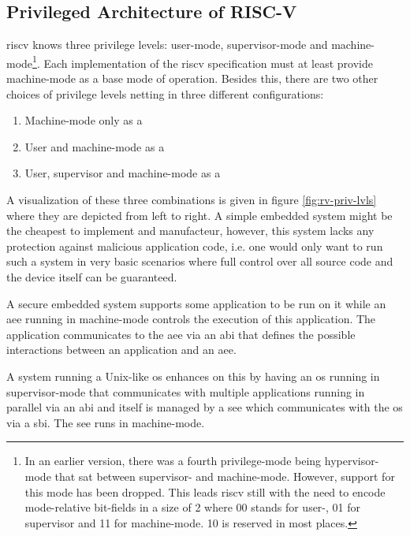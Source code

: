 \subsection{Privileged Architecture of RISC-V}
\label{sec:rv-priv-arch}

\gls{riscv} knows three privilege levels: user-mode, supervisor-mode and machine-mode\footnote{%
    In an earlier version, there was a fourth privilege-mode being hypervisor-mode that sat between supervisor- and machine-mode.
    However, support for this mode has been dropped.
    This leads \gls{riscv} still with the need to encode mode-relative bit-fields in a size of 2 where 00 stands for user-, 01 for supervisor and 11 for machine-mode.
    10 is reserved in most places.
}.
Each implementation of the \gls{riscv} specification must at least provide machine-mode as a base mode of operation.
Besides this, there are two other choices of privilege levels netting in three different configurations:
\begin{enumerate}
    \item Machine-mode only as a 
    \item User and machine-mode as a 
    \item User, supervisor and machine-mode as a 
\end{enumerate}

A visualization of these three combinations is given in figure \ref{fig:rv-priv-lvls} where they are depicted from left to right.
A simple embedded system might be the cheapest to implement and manufacteur, however, this system lacks any protection against malicious application code, i.e. one would only want to run such a system in very basic scenarios where full control over all source code and the device itself can be guaranteed.

A secure embedded system supports some application to be run on it while an \gls{aee} running in machine-mode controls the execution of this application.
The application communicates to the \gls{aee} via an \gls{abi} that defines the possible interactions between an application and an \gls{aee}.

A system running a Unix-like \gls{os} enhances on this by having an \gls{os} running in supervisor-mode that communicates with multiple applications running in parallel via an \gls{abi} and itself is managed by a \gls{see} which communicates with the \gls{os} via a \gls{sbi}.
The \gls{see} runs in machine-mode.

